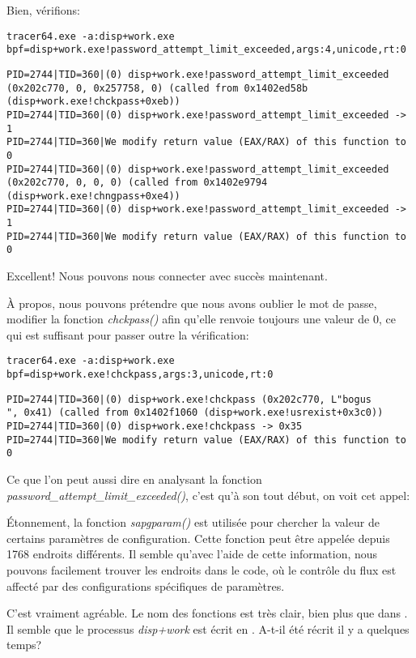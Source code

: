 Bien, vérifions:

\begin{lstlisting}
tracer64.exe -a:disp+work.exe bpf=disp+work.exe!password_attempt_limit_exceeded,args:4,unicode,rt:0
\end{lstlisting}

\begin{lstlisting}
PID=2744|TID=360|(0) disp+work.exe!password_attempt_limit_exceeded (0x202c770, 0, 0x257758, 0) (called from 0x1402ed58b (disp+work.exe!chckpass+0xeb))
PID=2744|TID=360|(0) disp+work.exe!password_attempt_limit_exceeded -> 1
PID=2744|TID=360|We modify return value (EAX/RAX) of this function to 0
PID=2744|TID=360|(0) disp+work.exe!password_attempt_limit_exceeded (0x202c770, 0, 0, 0) (called from 0x1402e9794 (disp+work.exe!chngpass+0xe4))
PID=2744|TID=360|(0) disp+work.exe!password_attempt_limit_exceeded -> 1
PID=2744|TID=360|We modify return value (EAX/RAX) of this function to 0
\end{lstlisting}

Excellent! Nous pouvons nous connecter avec succès maintenant.

À propos, nous pouvons prétendre que nous avons oublier le mot de passe, modifier
la fonction \emph{chckpass()} afin qu'elle renvoie toujours une valeur de 0, ce qui
est suffisant pour passer outre la vérification:

\begin{lstlisting}
tracer64.exe -a:disp+work.exe bpf=disp+work.exe!chckpass,args:3,unicode,rt:0
\end{lstlisting}

\begin{lstlisting}
PID=2744|TID=360|(0) disp+work.exe!chckpass (0x202c770, L"bogus                                   ", 0x41) (called from 0x1402f1060 (disp+work.exe!usrexist+0x3c0))
PID=2744|TID=360|(0) disp+work.exe!chckpass -> 0x35
PID=2744|TID=360|We modify return value (EAX/RAX) of this function to 0
\end{lstlisting}

Ce que l'on peut aussi dire en analysant la fonction\\
\emph{password\_attempt\_limit\_exceeded()},
c'est qu'à son tout début, on voit cet appel:



Étonnement, la fonction \emph{sapgparam()} est utilisée pour chercher la valeur de
certains paramètres de configuration. Cette fonction peut être appelée depuis 1768
endroits différents.
Il semble qu'avec l'aide de cette information, nous pouvons facilement trouver les
endroits dans le code, où le contrôle du flux est affecté par des configurations
spécifiques de paramètres.

C'est vraiment agréable. Le nom des fonctions est très clair, bien plus que dans \oracle.
\myindex{\Cpp}
Il semble que le processus \emph{disp+work} est écrit en \Cpp. A-t-il été récrit il y a quelques temps?
